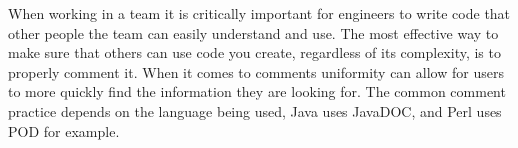 \documentclass[letterpaper,11pt]{texMemo} %
\begin{document}
\maketitle %


\indent When working in a team it is critically important for engineers to write code that
other people the team can easily understand and use. The most effective way to make sure
that others can use code you create, regardless of its complexity, is to properly comment it.
When it comes to comments uniformity can allow for users to more quickly find the information
they are looking for. The common comment practice depends on the language being used,
Java uses JavaDOC, and Perl uses POD for example.

\end{document}
